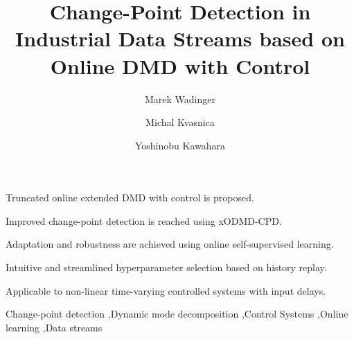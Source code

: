 \documentclass[preprint,12pt,authoryear]{elsarticle}
\begin{document}
\begin{frontmatter}


	\title{Change-Point Detection in Industrial Data Streams based on Online DMD with Control}

	\author[aff1,aff2]{Marek Wadinger}

	\author[aff1]{Michal Kvasnica}

	\author[aff2]{Yoshinobu Kawahara}



	\begin{abstract}
		
	\end{abstract}

	\begin{graphicalabstract}
	\end{graphicalabstract}

	\begin{highlights}
		\item Truncated online extended DMD with control is proposed.
		\item Improved change-point detection is reached using xODMD-CPD.
		\item Adaptation and robustness are achieved using online self-supervised learning.
		\item Intuitive and streamlined hyperparameter selection based on history replay.
		\item Applicable to non-linear time-varying controlled systems with input delays.
	\end{highlights}


	\begin{keyword}
		Change-point detection
		\sep{Dynamic mode decomposition}
		\sep{Control Systems}
		\sep{Online learning}
		\sep{Data streams}
	\end{keyword}

\end{frontmatter}
\end{document}
